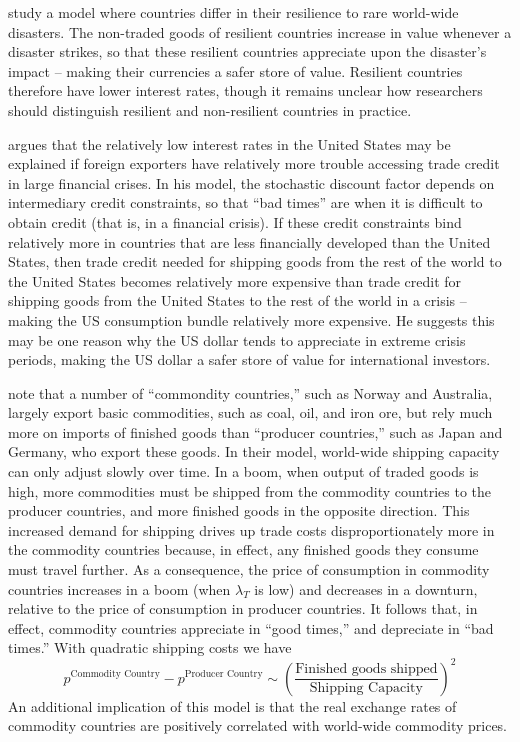 \documentclass{ar-1col}
\begin{document}
\citet{FarhiGabaix2016} study a model where countries differ in their resilience to rare world-wide disasters. The non-traded goods of resilient countries increase in value whenever a disaster strikes, so that these resilient countries appreciate upon the disaster's impact -- making their currencies a safer store of value. Resilient countries therefore have lower interest rates, though it remains unclear how researchers should distinguish resilient and non-resilient countries in practice.

\citet{Maggiori2013} argues that the relatively low interest rates in the United States may be explained if foreign exporters have relatively more trouble accessing trade credit in large financial crises. In his model, the stochastic discount factor depends on intermediary credit constraints, so that ``bad times'' are when it is difficult to obtain credit (that is, in a financial crisis). If these credit constraints bind relatively more in countries that are less financially developed than the United States, then trade credit needed for shipping goods from the rest of the world to the United States becomes relatively more expensive than trade credit for shipping goods from the United States to the rest of the world in a crisis -- making the US consumption bundle relatively more expensive. He suggests this may be one reason why the US dollar tends to appreciate in extreme crisis periods, making the US dollar a safer store of value for international investors.

\citet{Readyetal2013} note that a number of ``commondity countries,'' such as Norway and Australia, largely export basic commodities, such as coal, oil, and iron ore, but rely much more on imports of finished goods than ``producer countries,'' such as Japan and Germany, who export these goods. In their model, world-wide shipping capacity can only adjust slowly over time. In a boom, when output of traded goods is high, more commodities must be shipped from the commodity countries to the producer countries, and more finished goods in the opposite direction. This increased demand for shipping drives up trade costs disproportionately more in the commodity countries because, in effect, any finished goods they consume must travel further. As a consequence, the price of consumption in commodity countries increases in a boom (when $\lambda_T$ is low) and decreases in a downturn, relative to the price of consumption in producer countries. It follows that, in effect, commodity countries appreciate in ``good times,'' and depreciate in ``bad times.'' With quadratic shipping costs we have
\begin{equation*}
  p^{\text{Commodity Country}}-p^{\text{Producer Country}}\sim\left(\frac{\text{Finished goods shipped}}{\text{Shipping Capacity}}\right)^2
\end{equation*}
An additional implication of this model is that the real exchange rates of commodity countries are positively correlated with world-wide commodity prices. 
\end{document}
